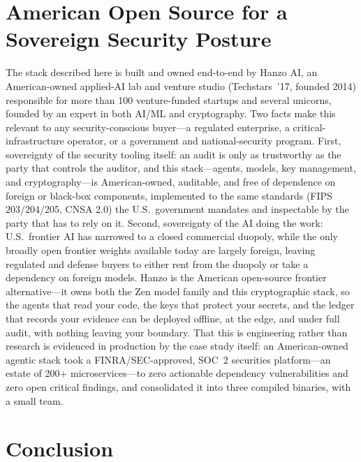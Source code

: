 \documentclass[11pt,letterpaper]{article}
\begin{document}
\section{American Open Source for a Sovereign Security Posture}

The stack described here is built and owned end-to-end by Hanzo AI, an
American-owned applied-AI lab and venture studio (Techstars~'17, founded 2014)
responsible for more than 100 venture-funded startups and several unicorns,
founded by an expert in both AI/ML and cryptography. Two facts make this relevant
to any security-conscious buyer---a regulated enterprise, a critical-infrastructure
operator, or a government and national-security program. First, sovereignty of the
security
tooling itself: an audit is only as trustworthy as the party that controls the
auditor, and this stack---agents, models, key management, and cryptography---is
American-owned, auditable, and free of dependence on foreign or black-box
components, implemented to the same standards (FIPS 203/204/205, CNSA 2.0) the
U.S.\ government mandates and inspectable by the party that has to rely on it.
Second, sovereignty of the AI doing the work: U.S.\ frontier AI has narrowed to a
closed commercial duopoly, while the only broadly open frontier weights available
today are largely foreign, leaving regulated and defense buyers to either rent
from the duopoly or take a dependency on foreign models. Hanzo is the American
open-source frontier alternative---it owns both the Zen model family and this
cryptographic stack, so the agents that read your code, the keys that protect your
secrets, and the ledger that records your evidence can be deployed offline, at the
edge, and under full audit, with nothing leaving your boundary. That this is
engineering rather than research is evidenced in production by the case study
itself: an American-owned agentic stack took a FINRA/SEC-approved, SOC~2 securities
platform---an estate of 200+ microservices---to zero actionable dependency
vulnerabilities and zero open critical findings, and consolidated it into three
compiled binaries, with a small team.

\section{Conclusion}
\end{document}

